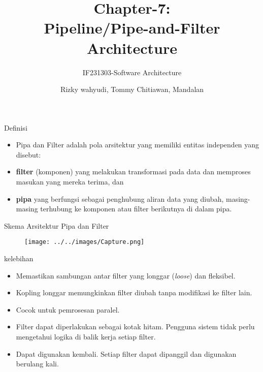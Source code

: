 \documentclass[aspectratio=169, table]{beamer}
\title{\Large Chapter-7:\\Pipeline/Pipe-and-Filter\\Architecture}
\subtitle{IF231303-Software Architecture}
\author{Rizky wahyudi, Tommy Chitiawan, Mandalan}
\begin{document}
    \frame{\titlepage}

    \begin{frame}{Definisi}
        \begin{itemize}
            \item  Pipa dan Filter adalah pola arsitektur yang memiliki entitas independen yang disebut:
            \item \textbf{filter} (komponen) yang melakukan transformasi pada data dan memproses masukan yang mereka terima, dan
            \item \textbf{pipa} yang berfungsi sebagai penghubung aliran data yang diubah, masing-masing terhubung ke komponen atau filter berikutnya di dalam pipa.
        \end{itemize}
    \end{frame}

    \begin{frame}{Skema Arsitektur Pipa dan Filter}
        \begin{figure}[h]
            \centering
            \texttt{[image: ../../images/Capture.png]}
        \end{figure}
    \end{frame}

    \begin{frame}{kelebihan}
        \begin{itemize}
            \item Memastikan sambungan antar filter yang longgar (\textit{loose}) dan fleksibel.
            \item Kopling longgar memungkinkan filter diubah tanpa modifikasi ke filter lain.
            \item Cocok untuk pemrosesan paralel.
            \item Filter dapat diperlakukan sebagai kotak hitam. Pengguna sistem tidak perlu mengetahui logika di balik kerja setiap filter.
            \item Dapat digunakan kembali. Setiap filter dapat dipanggil dan digunakan berulang kali.
        \end{itemize}
    \end{frame}
\end{document}
